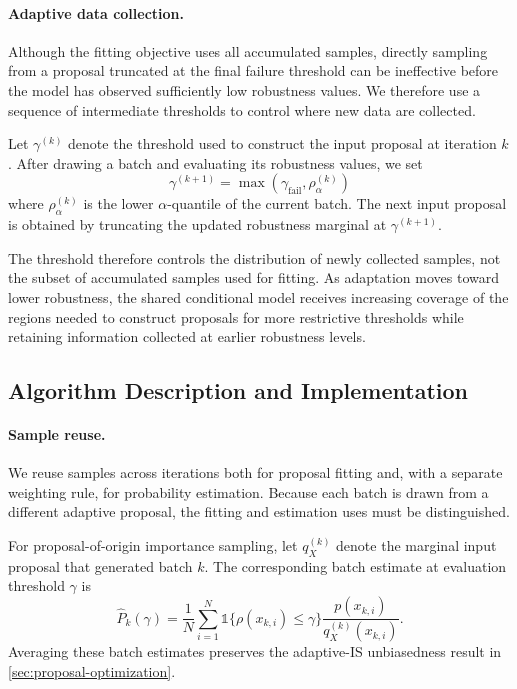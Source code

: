 \documentclass[twoside,11pt]{article}
\begin{document}
\paragraph{Adaptive data collection.}
Although the fitting objective uses all accumulated samples, directly sampling from a proposal truncated at the final failure threshold can be ineffective before the model has observed sufficiently low robustness values. We therefore use a sequence of intermediate thresholds to control where new data are collected.

Let $\gamma^{(k)}$ denote the threshold used to construct the input proposal at iteration $k$. After drawing a batch and evaluating its robustness values, we set
\[
    \gamma^{(k+1)}
    =
    \max\!\left(
        \gamma_{\mathrm{fail}},
        \rho_\alpha^{(k)}
    \right)
\]
where $\rho_\alpha^{(k)}$ is the lower $\alpha$-quantile of the current batch. The next input proposal is obtained by truncating the updated robustness marginal at $\gamma^{(k+1)}$.

The threshold therefore controls the distribution of newly collected samples, not the subset of accumulated samples used for fitting. As adaptation moves toward lower robustness, the shared conditional model receives increasing coverage of the regions needed to construct proposals for more restrictive thresholds while retaining information collected at earlier robustness levels.

\subsection{Algorithm Description and Implementation}
\label{sec:alg-desc}

\paragraph{Sample reuse.}
We reuse samples across iterations both for proposal fitting and, with a separate weighting rule, for probability estimation. Because each batch is drawn from a different adaptive proposal, the fitting and estimation uses must be distinguished.

For proposal-of-origin importance sampling, let $q_X^{(k)}$ denote the marginal input proposal that generated batch $k$. The corresponding batch estimate at evaluation threshold $\gamma$ is
\begin{equation}
    \label{eq:batch-is}
    \hat{P}_k(\gamma)
    =
    \frac{1}{N}
    \sum_{i=1}^{N}
    \mathds{1}\{\rho(x_{k,i})\leq\gamma\}
    \frac{p(x_{k,i})}{q_X^{(k)}(x_{k,i})}.
\end{equation}
Averaging these batch estimates preserves the adaptive-IS unbiasedness result in \cref{sec:proposal-optimization}.
\end{document}
